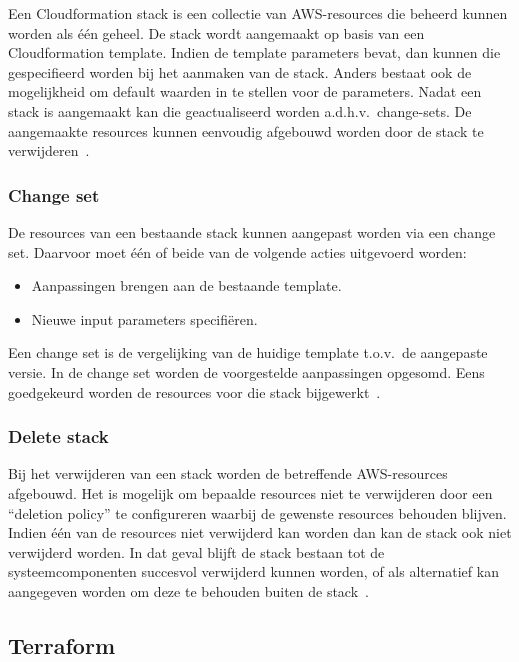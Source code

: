 Een Cloudformation stack is een collectie van AWS-resources die beheerd kunnen worden als één geheel.
De stack wordt aangemaakt op basis van een Cloudformation template.
Indien de template parameters bevat, dan kunnen die gespecifieerd worden bij het aanmaken van de stack.
Anders bestaat ook de mogelijkheid om default waarden in te stellen voor de parameters.
Nadat een stack is aangemaakt kan die geactualiseerd worden a.d.h.v.\ change-sets.
De aangemaakte resources kunnen eenvoudig afgebouwd worden door de stack te verwijderen~\autocite{AWSCLoudformationUser}.

\subsubsection{Change set}

De resources van een bestaande stack kunnen aangepast worden via een change set.
Daarvoor moet één of beide van de volgende acties uitgevoerd worden:

\begin{itemize}
    \item Aanpassingen brengen aan de bestaande template.
    \item Nieuwe input parameters specifiëren.
\end{itemize}

Een change set is de vergelijking van de huidige template t.o.v.\ de aangepaste versie.
In de change set worden de voorgestelde aanpassingen opgesomd.
Eens goedgekeurd worden de resources voor die stack bijgewerkt~\autocite{AWSCLoudformationUser}.

\subsubsection{Delete stack}

Bij het verwijderen van een stack worden de betreffende AWS-resources afgebouwd.
Het is mogelijk om bepaalde resources niet te verwijderen door een “deletion policy” te configureren waarbij de gewenste resources behouden blijven.
Indien één van de resources niet verwijderd kan worden dan kan de stack ook niet verwijderd worden.
In dat geval blijft de stack bestaan tot de systeemcomponenten succesvol verwijderd kunnen worden, of als alternatief kan aangegeven worden om deze te behouden buiten de stack~\autocite{AWSCLoudformationUser}.

\subsection{Terraform}
\label{sec:service-terraform}

